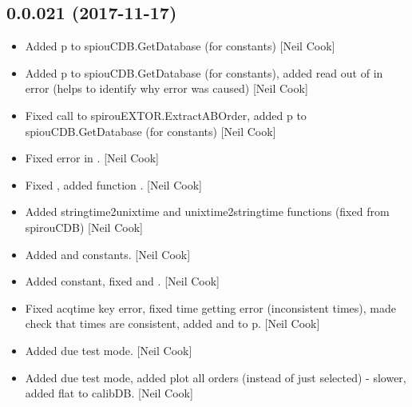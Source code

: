 \documentclass[a4paper,10pt,english]{report}
\begin{document}
\subsection{0.0.021 (2017-11-17)}
\label{\detokenize{misc/changelog:id529}}\begin{itemize}
\item {} 
Added p to spiouCDB.GetDatabase (for  constants) {[}Neil Cook{]}

\item {} 
Added p to spiouCDB.GetDatabase (for  constants), added read
out of  in error (helps to identify why error was caused)
{[}Neil Cook{]}

\item {} 
Fixed call to spirouEXTOR.ExtractABOrder, added p to
spiouCDB.GetDatabase (for  constants) {[}Neil Cook{]}

\item {} 
Fixed error in . {[}Neil Cook{]}

\item {} 
Fixed , added function
. {[}Neil Cook{]}

\item {} 
Added stringtime2unixtime and unixtime2stringtime functions (fixed
from spirouCDB) {[}Neil Cook{]}

\item {} 
Added  and  constants. {[}Neil Cook{]}

\item {} 
Added  constant, fixed  and
. {[}Neil Cook{]}

\item {} 
Fixed acqtime key error, fixed time getting error (inconsistent
times), made check that times are consistent, added  and
 to p. {[}Neil Cook{]}

\item {} 
Added due test mode. {[}Neil Cook{]}

\item {} 
Added due test mode, added plot all orders (instead of just selected)
- slower, added flat to calibDB. {[}Neil Cook{]}


\end{itemize}
\end{document}
